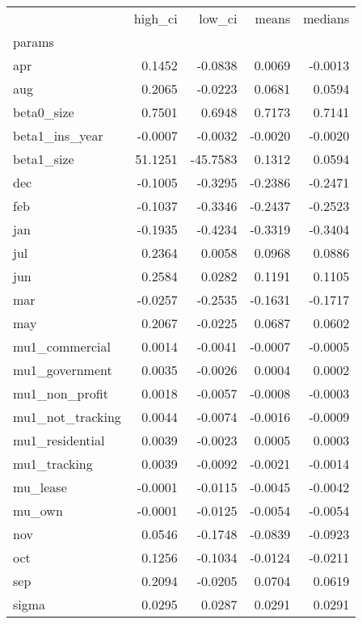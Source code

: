 \begin{tabular}{lrrrr}
\toprule
{} &  high\_ci &   low\_ci &   means &  medians \\
params           &          &          &         &          \\
\midrule
apr              &   0.1452 &  -0.0838 &  0.0069 &  -0.0013 \\
aug              &   0.2065 &  -0.0223 &  0.0681 &   0.0594 \\
beta0\_size       &   0.7501 &   0.6948 &  0.7173 &   0.7141 \\
beta1\_ins\_year   &  -0.0007 &  -0.0032 & -0.0020 &  -0.0020 \\
beta1\_size       &  51.1251 & -45.7583 &  0.1312 &   0.0594 \\
dec              &  -0.1005 &  -0.3295 & -0.2386 &  -0.2471 \\
feb              &  -0.1037 &  -0.3346 & -0.2437 &  -0.2523 \\
jan              &  -0.1935 &  -0.4234 & -0.3319 &  -0.3404 \\
jul              &   0.2364 &   0.0058 &  0.0968 &   0.0886 \\
jun              &   0.2584 &   0.0282 &  0.1191 &   0.1105 \\
mar              &  -0.0257 &  -0.2535 & -0.1631 &  -0.1717 \\
may              &   0.2067 &  -0.0225 &  0.0687 &   0.0602 \\
mu1\_commercial   &   0.0014 &  -0.0041 & -0.0007 &  -0.0005 \\
mu1\_government   &   0.0035 &  -0.0026 &  0.0004 &   0.0002 \\
mu1\_non\_profit   &   0.0018 &  -0.0057 & -0.0008 &  -0.0003 \\
mu1\_not\_tracking &   0.0044 &  -0.0074 & -0.0016 &  -0.0009 \\
mu1\_residential  &   0.0039 &  -0.0023 &  0.0005 &   0.0003 \\
mu1\_tracking     &   0.0039 &  -0.0092 & -0.0021 &  -0.0014 \\
mu\_lease         &  -0.0001 &  -0.0115 & -0.0045 &  -0.0042 \\
mu\_own           &  -0.0001 &  -0.0125 & -0.0054 &  -0.0054 \\
nov              &   0.0546 &  -0.1748 & -0.0839 &  -0.0923 \\
oct              &   0.1256 &  -0.1034 & -0.0124 &  -0.0211 \\
sep              &   0.2094 &  -0.0205 &  0.0704 &   0.0619 \\
sigma            &   0.0295 &   0.0287 &  0.0291 &   0.0291 \\
\bottomrule
\end{tabular}
